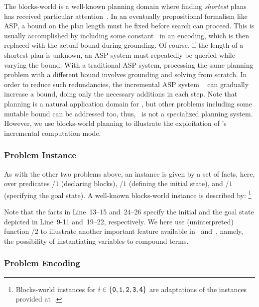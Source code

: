 The blocks-world is a well-known planning domain
where finding \emph{shortest} plans has received particular attention~\cite{gupnau92a}.
In an eventually propositional formalism like ASP,
a bound on the plan length must be fixed before search can proceed.
This is usually accomplished by including some constant~
in an encoding, which is then replaced with the actual bound during grounding.
Of course, if the length of a shortest plan is unknown,
an ASP system must repeatedly be queried while varying the bound.
With a traditional ASP system, processing
the same planning problem with a different bound
involves grounding and solving from scratch.
\tbr
In order to reduce such redundancies,
the incremental ASP system \iclingo~\cite{gekakaosscth08a}
can gradually increase a bound, %
doing only the necessary additions in each step.
Note that planning is a natural application domain for \iclingo,
but other problems including some mutable bound can be addressed too, thus,
\iclingo\ is not a specialized planning system.
However, we use blocks-world planning to illustrate the exploitation of
\iclingo's incremental computation mode.


\subsubsection{Problem Instance}\label{subsec:block:instance}

As with the other two problems above,
an instance is given by a set of facts, here,
over predicates /$1$ (declaring blocks),
/$1$ (defining the initial state), and
/$1$ (specifying the goal state).
A well-known blocks-world instance is described by:%
\footnote{%
  Blocks-world instances  for $i\in\{\texttt{0},\texttt{1},\texttt{2},\texttt{3},\texttt{4}\}$
  are adaptations of the instances provided at~\cite{erdemBW}.}
%

%
Note that the facts in Line~13--15 and~24--26 specify the initial
and the goal state depicted in Line~9-11 and~19--22, respectively.
We here use (uninterpreted) function /$2$ to illustrate another
important feature available in \gringo\ and~\clingo, namely,
the possibility of instantiating variables to compound terms.


\subsubsection{Problem Encoding}\label{subsec:block:encoding}

